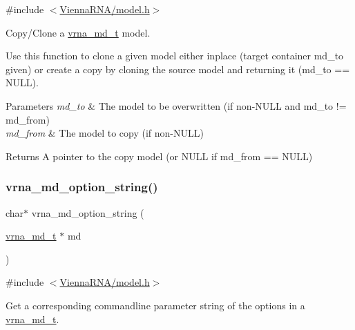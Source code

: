 {\ttfamily \#include $<$\hyperlink{model_8h}{Vienna\+R\+N\+A/model.\+h}$>$}



Copy/\+Clone a \hyperlink{group__model__details_ga1f8a10e12a0a1915f2a4eff0b28ea17c}{vrna\+\_\+md\+\_\+t} model. 

Use this function to clone a given model either inplace (target container {\ttfamily md\+\_\+to} given) or create a copy by cloning the source model and returning it ({\ttfamily md\+\_\+to} == N\+U\+LL).


\begin{DoxyParams}{Parameters}
{\em md\+\_\+to} & The model to be overwritten (if non-\/\+N\+U\+LL and {\ttfamily md\+\_\+to} != {\ttfamily md\+\_\+from}) \\
\hline
{\em md\+\_\+from} & The model to copy (if non-\/\+N\+U\+LL) \\
\hline
\end{DoxyParams}
\begin{DoxyReturn}{Returns}
A pointer to the copy model (or N\+U\+LL if {\ttfamily md\+\_\+from} == N\+U\+LL) 
\end{DoxyReturn}
\mbox{\label{group__model__details_ga3a7469f0725a849af6ba61a57dfd60ce}} 
\subsubsection{\texorpdfstring{vrna\+\_\+md\+\_\+option\+\_\+string()}{vrna\_md\_option\_string()}}
{\footnotesize\ttfamily char$\ast$ vrna\+\_\+md\+\_\+option\+\_\+string (\begin{DoxyParamCaption}\item[{\hyperlink{group__model__details_ga1f8a10e12a0a1915f2a4eff0b28ea17c}{vrna\+\_\+md\+\_\+t} $\ast$}]{md }\end{DoxyParamCaption})}



{\ttfamily \#include $<$\hyperlink{model_8h}{Vienna\+R\+N\+A/model.\+h}$>$}



Get a corresponding commandline parameter string of the options in a \hyperlink{group__model__details_ga1f8a10e12a0a1915f2a4eff0b28ea17c}{vrna\+\_\+md\+\_\+t}. 

